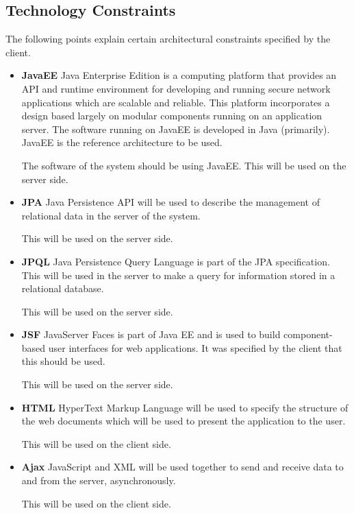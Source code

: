 

\subsection{Technology Constraints}
The following points explain certain architectural constraints specified by the client. 
\begin{itemize}
	\item{\textbf{JavaEE}}
	\newline
	Java Enterprise Edition is a computing platform that provides an API and runtime environment for developing and running secure network applications which are scalable and reliable. This platform incorporates a design based largely on modular components running on an application server. The software running on 					JavaEE is developed in Java (primarily). JavaEE is the reference architecture to be used.
	\newline

	The software of the system should be using JavaEE. This will be used on the server side.

	\item{\textbf{JPA}}
	\newline
	Java Persistence API will be used to describe the management of relational data in the server of the system.
	\newline

	This will be used on the server side.

	\item{\textbf{JPQL}}
	\newline
	Java Persistence Query Language is part of the JPA specification. This will be used in the server to make a query for information stored in a relational database.
	\newline

	This will be used on the server side.

	\item{\textbf{JSF}}
	\newline
	JavaServer Faces is part of Java EE and is used to build component-based user interfaces for web applications. It was specified by the client that this should be used.
	\newline

	This will be used on the server side.

	\item{\textbf{HTML}}
	\newline
	HyperText Markup Language will be used to specify the structure of the web documents which will be used to present the application to the user.
	\newline

	This will be used on the client side.

	\item{\textbf{Ajax}}
	\newline
	JavaScript and XML will be used together to send and receive data to and from the server, asynchronously.
	\newline

	This will be used on the client side.
\end{itemize}


